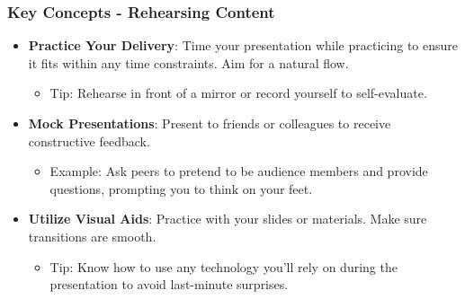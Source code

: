 \documentclass[aspectratio=169]{beamer}
\begin{document}
\begin{frame}[fragile]
    \frametitle{Key Concepts - Rehearsing Content}
    \begin{itemize}
        \item \textbf{Practice Your Delivery}: 
        Time your presentation while practicing to ensure it fits within any time constraints. Aim for a natural flow.
        \begin{itemize}
            \item Tip: Rehearse in front of a mirror or record yourself to self-evaluate.
        \end{itemize}
        
        \item \textbf{Mock Presentations}: 
        Present to friends or colleagues to receive constructive feedback.
        \begin{itemize}
            \item Example: Ask peers to pretend to be audience members and provide questions, prompting you to think on your feet.
        \end{itemize}
        
        \item \textbf{Utilize Visual Aids}: 
        Practice with your slides or materials. Make sure transitions are smooth.
        \begin{itemize}
            \item Tip: Know how to use any technology you'll rely on during the presentation to avoid last-minute surprises.
        \end{itemize}
    \end{itemize}
\end{frame}
\end{document}
